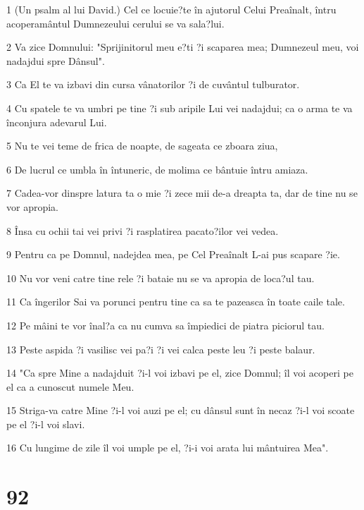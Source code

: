 \par 1 (Un psalm al lui David.) Cel ce locuie?te în ajutorul Celui Preaînalt, întru acoperamântul Dumnezeului cerului se va sala?lui.
\par 2 Va zice Domnului: "Sprijinitorul meu e?ti ?i scaparea mea; Dumnezeul meu, voi nadajdui spre Dânsul".
\par 3 Ca El te va izbavi din cursa vânatorilor ?i de cuvântul tulburator.
\par 4 Cu spatele te va umbri pe tine ?i sub aripile Lui vei nadajdui; ca o arma te va înconjura adevarul Lui.
\par 5 Nu te vei teme de frica de noapte, de sageata ce zboara ziua,
\par 6 De lucrul ce umbla în întuneric, de molima ce bântuie întru amiaza.
\par 7 Cadea-vor dinspre latura ta o mie ?i zece mii de-a dreapta ta, dar de tine nu se vor apropia.
\par 8 Însa cu ochii tai vei privi ?i rasplatirea pacato?ilor vei vedea.
\par 9 Pentru ca pe Domnul, nadejdea mea, pe Cel Preaînalt L-ai pus scapare ?ie.
\par 10 Nu vor veni catre tine rele ?i bataie nu se va apropia de loca?ul tau.
\par 11 Ca îngerilor Sai va porunci pentru tine ca sa te pazeasca în toate caile tale.
\par 12 Pe mâini te vor înal?a ca nu cumva sa împiedici de piatra piciorul tau.
\par 13 Peste aspida ?i vasilisc vei pa?i ?i vei calca peste leu ?i peste balaur.
\par 14 "Ca spre Mine a nadajduit ?i-l voi izbavi pe el, zice Domnul; îl voi acoperi pe el ca a cunoscut numele Meu.
\par 15 Striga-va catre Mine ?i-l voi auzi pe el; cu dânsul sunt în necaz ?i-l voi scoate pe el ?i-l voi slavi.
\par 16 Cu lungime de zile îl voi umple pe el, ?i-i voi arata lui mântuirea Mea".

\chapter{92}

